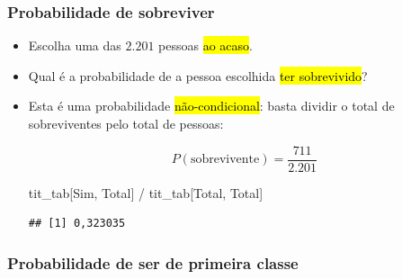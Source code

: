 \documentclass[
  11pt]{report}
\newenvironment{Shaded}{\begin{snugshade}}{\end{snugshade}}
\newcommand{\NormalTok}[1]{#1}
\newcommand{\SpecialCharTok}[1]{\textcolor[rgb]{0.00,0.00,0.00}{#1}}
\newcommand{\StringTok}[1]{\textcolor[rgb]{0.31,0.60,0.02}{#1}}
\renewenvironment{Shaded}{
    \begin{mdframed}[%
      roundcorner=2pt,%
      innerleftmargin=5pt,%
      innerrightmargin=5pt,%
      topline=true,%
      leftline=true,%
      rightline=true,%
      bottomline=true,%
      linewidth=0.5pt,%
      linecolor=black!20,%
      backgroundcolor=black!2,%
      skipabove=2ex,%
      skipbelow=2.5ex%
    ]%
  }
  {
    \end{mdframed}
  }
\begin{document}
\hypertarget{probabilidade-de-sobreviver}{%
\subsubsection*{Probabilidade de sobreviver}\label{probabilidade-de-sobreviver}}

\begin{itemize}
\item
  Escolha uma das $2.201$ pessoas {\hl{ao acaso}}.
\item
  Qual é a probabilidade de a pessoa escolhida {\hl{ter sobrevivido}}?
\item
  Esta é uma probabilidade {\hl{não-condicional}}: basta dividir o total de sobreviventes pelo total de pessoas:

  \[
  P(\text{sobrevivente}) = 
  \frac
  {711}
  {2.201}
  \]

\begin{Shaded}
\begin{Highlighting}[]
\NormalTok{tit\_tab[}\StringTok{\textquotesingle{}Sim\textquotesingle{}}\NormalTok{, }\StringTok{\textquotesingle{}Total\textquotesingle{}}\NormalTok{] }\SpecialCharTok{/}\NormalTok{ tit\_tab[}\StringTok{\textquotesingle{}Total\textquotesingle{}}\NormalTok{, }\StringTok{\textquotesingle{}Total\textquotesingle{}}\NormalTok{]}
\end{Highlighting}
\end{Shaded}

\begin{verbatim}
## [1] 0,323035
\end{verbatim}
\end{itemize}

\hypertarget{probabilidade-de-ser-de-primeira-classe}{%
\subsubsection*{Probabilidade de ser de primeira classe}\label{probabilidade-de-ser-de-primeira-classe}}
\end{document}
